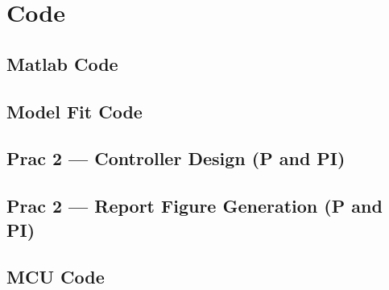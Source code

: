 \section{Code}

\subsection{Matlab Code}


\subsection{Model Fit Code}


\subsection{Prac 2 — Controller Design (P and PI)}
% 

\subsection{Prac 2 — Report Figure Generation (P and PI)}
% 

\subsection{MCU Code}


